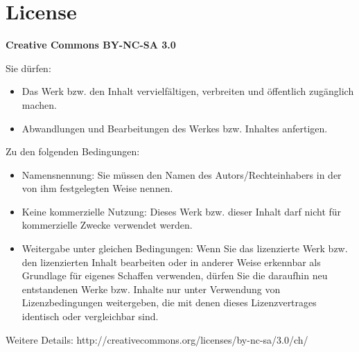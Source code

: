 {\scriptsize 
    \section*{License}
    \textbf{Creative Commons BY-NC-SA 3.0}
    
    Sie dürfen:
    \begin{itemize}
        \item Das Werk bzw. den Inhalt vervielfältigen, verbreiten und öffentlich
        zugänglich machen.
        \item Abwandlungen und Bearbeitungen des Werkes bzw. Inhaltes anfertigen.
    \end{itemize}
    Zu den folgenden Bedingungen:
    \begin{itemize}
        \item Namensnennung: Sie müssen den Namen des Autors/Rechteinhabers in der von ihm
        festgelegten Weise nennen.
        \item Keine kommerzielle Nutzung: Dieses Werk bzw. dieser Inhalt darf nicht für
        kommerzielle Zwecke verwendet werden.
        \item  Weitergabe unter gleichen Bedingungen: Wenn Sie das lizenzierte Werk bzw. den
        lizenzierten Inhalt bearbeiten oder in anderer Weise erkennbar als Grundlage
        für eigenes Schaffen verwenden, dürfen Sie die daraufhin neu entstandenen
        Werke bzw. Inhalte nur unter Verwendung von Lizenzbedingungen weitergeben,
        die mit denen dieses Lizenzvertrages identisch oder vergleichbar sind.
    \end{itemize}
    Weitere Details: http://creativecommons.org/licenses/by-nc-sa/3.0/ch/
}
\clearpage
{}%